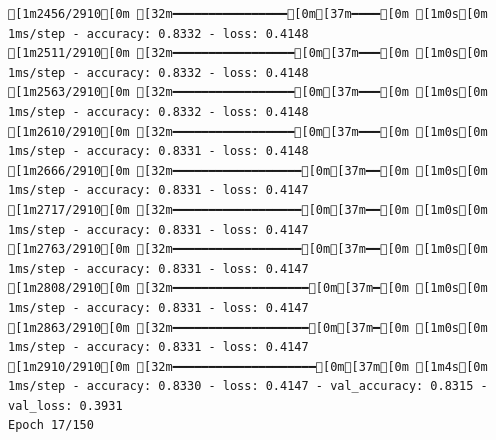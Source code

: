 \documentclass[
  letterpaper,
  DIV=11,
  numbers=noendperiod]{scrartcl}
\begin{document}
\begin{verbatim}
[1m2456/2910[0m [32m━━━━━━━━━━━━━━━━[0m[37m━━━━[0m [1m0s[0m 1ms/step - accuracy: 0.8332 - loss: 0.4148
[1m2511/2910[0m [32m━━━━━━━━━━━━━━━━━[0m[37m━━━[0m [1m0s[0m 1ms/step - accuracy: 0.8332 - loss: 0.4148
[1m2563/2910[0m [32m━━━━━━━━━━━━━━━━━[0m[37m━━━[0m [1m0s[0m 1ms/step - accuracy: 0.8332 - loss: 0.4148
[1m2610/2910[0m [32m━━━━━━━━━━━━━━━━━[0m[37m━━━[0m [1m0s[0m 1ms/step - accuracy: 0.8331 - loss: 0.4148
[1m2666/2910[0m [32m━━━━━━━━━━━━━━━━━━[0m[37m━━[0m [1m0s[0m 1ms/step - accuracy: 0.8331 - loss: 0.4147
[1m2717/2910[0m [32m━━━━━━━━━━━━━━━━━━[0m[37m━━[0m [1m0s[0m 1ms/step - accuracy: 0.8331 - loss: 0.4147
[1m2763/2910[0m [32m━━━━━━━━━━━━━━━━━━[0m[37m━━[0m [1m0s[0m 1ms/step - accuracy: 0.8331 - loss: 0.4147
[1m2808/2910[0m [32m━━━━━━━━━━━━━━━━━━━[0m[37m━[0m [1m0s[0m 1ms/step - accuracy: 0.8331 - loss: 0.4147
[1m2863/2910[0m [32m━━━━━━━━━━━━━━━━━━━[0m[37m━[0m [1m0s[0m 1ms/step - accuracy: 0.8331 - loss: 0.4147
[1m2910/2910[0m [32m━━━━━━━━━━━━━━━━━━━━[0m[37m[0m [1m4s[0m 1ms/step - accuracy: 0.8330 - loss: 0.4147 - val_accuracy: 0.8315 - val_loss: 0.3931
Epoch 17/150


\end{verbatim}
\end{document}
